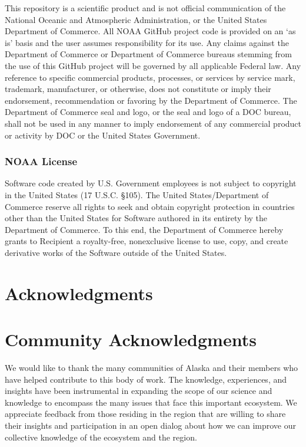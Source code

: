 \documentclass[
  letterpaper,
  oneside,
  open=any]{scrbook}
\begin{document}
This repository is a scientific product and is not official
communication of the National Oceanic and Atmospheric Administration, or
the United States Department of Commerce. All NOAA GitHub project code
is provided on an `as is' basis and the user assumes responsibility for
its use. Any claims against the Department of Commerce or Department of
Commerce bureaus stemming from the use of this GitHub project will be
governed by all applicable Federal law. Any reference to specific
commercial products, processes, or services by service mark, trademark,
manufacturer, or otherwise, does not constitute or imply their
endorsement, recommendation or favoring by the Department of Commerce.
The Department of Commerce seal and logo, or the seal and logo of a DOC
bureau, shall not be used in any manner to imply endorsement of any
commercial product or activity by DOC or the United States Government.

\subsection{NOAA License}\label{noaa-license-1}

Software code created by U.S. Government employees is not subject to
copyright in the United States (17 U.S.C. §105). The United
States/Department of Commerce reserve all rights to seek and obtain
copyright protection in countries other than the United States for
Software authored in its entirety by the Department of Commerce. To this
end, the Department of Commerce hereby grants to Recipient a
royalty-free, nonexclusive license to use, copy, and create derivative
works of the Software outside of the United States.

\chapter{Acknowledgments}\label{acknowledgments}

\chapter{Community Acknowledgments}\label{community-acknowledgments}

We would like to thank the many communities of Alaska and their members
who have helped contribute to this body of work. The knowledge,
experiences, and insights have been instrumental in expanding the scope
of our science and knowledge to encompass the many issues that face this
important ecosystem. We appreciate feedback from those residing in the
region that are willing to share their insights and participation in an
open dialog about how we can improve our collective knowledge of the
ecosystem and the region.
\end{document}

